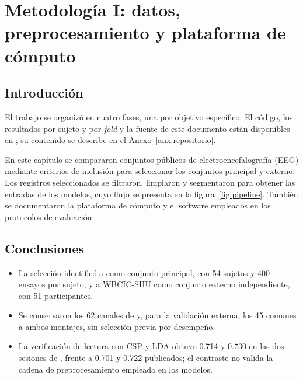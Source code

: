 \chapter{Metodología I: datos, preprocesamiento y plataforma de cómputo}
\label{cap:metodologia-datos}
\section{Introducción}
\label{cap:metodologia}

El trabajo se organizó en cuatro fases, una por objetivo específico. El código, los
resultados por sujeto y por \textit{fold} y la fuente de este documento están disponibles en
\cite{ayala2026repo}; su contenido se describe en el Anexo~\ref{anx:repositorio}.

En este capítulo se compararon conjuntos públicos de electroencefalografía (EEG) mediante criterios de inclusión para seleccionar los conjuntos principal y externo. Los registros seleccionados se filtraron, limpiaron y segmentaron para obtener las entradas de los modelos, cuyo flujo se presenta en la figura~\ref{fig:pipeline}. También se documentaron la plataforma de cómputo y el software empleados en los protocolos de evaluación.





\section{Conclusiones}
\begin{itemize}
  \item La selección identificó a \openbmi{} como conjunto principal, con 54 sujetos y 400 ensayos por sujeto, y a WBCIC-SHU como conjunto externo independiente, con 51 participantes.
  \item Se conservaron los 62 canales de \openbmi{} y, para la validación externa, los 45 comunes a ambos montajes, sin selección previa por desempeño.
  \item La verificación de lectura con CSP y LDA obtuvo 0.714 y 0.730 en las dos sesiones de \openbmi{}, frente a 0.701 y 0.722 publicados; el contraste no valida la cadena de preprocesamiento empleada en los modelos.
\end{itemize}
